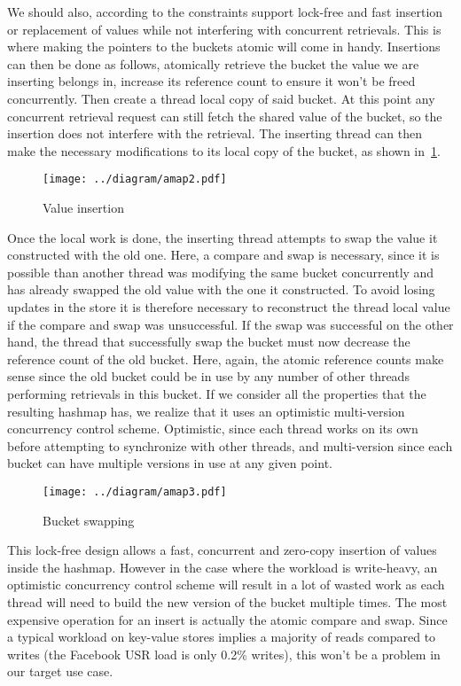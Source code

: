 \documentclass[11pt]{book}
\begin{document}
We should also, according to the constraints support lock-free and
fast insertion or replacement of values while not interfering with
concurrent retrievals. This is where making the pointers to the
buckets atomic will come in handy. Insertions can then be done as
follows, atomically retrieve the bucket the value we are inserting
belongs in, increase its reference count to ensure it won't be freed
concurrently. Then create a thread local copy of said bucket. At this
point any concurrent retrieval request can still fetch the shared
value of the bucket, so the insertion does not interfere with the
retrieval. The inserting thread can then make the necessary
modifications to its local copy of the bucket, as shown
in~\ref{fig:omvcc-insert}.

\begin{figure}[htb!]
  \texttt{[image: ../diagram/amap2.pdf]}
  \caption{Value insertion}
  \label{fig:omvcc-insert}
\end{figure}

Once the local work is done, the inserting thread attempts to swap the
value it constructed with the old one. Here, a compare and swap is
necessary, since it is possible than another thread was modifying the
same bucket concurrently and has already swapped the old value with
the one it constructed. To avoid losing updates in the store it is
therefore necessary to reconstruct the thread local value if the
compare and swap was unsuccessful. If the swap was successful on the
other hand, the thread that successfully swap the bucket must now
decrease the reference count of the old bucket. Here, again, the
atomic reference counts make sense since the old bucket could be in
use by any number of other threads performing retrievals in this
bucket. If we consider all the properties that the resulting hashmap
has, we realize that it uses an optimistic multi-version concurrency
control scheme. Optimistic, since each thread works on its own before
attempting to synchronize with other threads, and multi-version since
each bucket can have multiple versions in use at any given point.

\begin{figure}
  \texttt{[image: ../diagram/amap3.pdf]}
  \caption{Bucket swapping}
  \label{fig:omvcc-swap}
\end{figure}

This lock-free design allows a fast, concurrent and zero-copy
insertion of values inside the hashmap. However in the case where the
workload is write-heavy, an optimistic concurrency control scheme will
result in a lot of wasted work as each thread will need to build
the new version of the bucket multiple times. The most expensive
operation for an insert is actually the atomic compare and swap. Since
a typical workload on key-value stores implies a majority of reads
compared to writes (the Facebook USR load is only 0.2\% writes), this
won't be a problem in our target use case.
\end{document}
